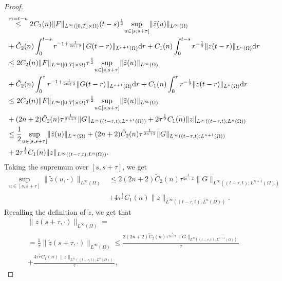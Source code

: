 \documentclass[10pt,a4paper,nouppercase,nowrite]{article}
\numberwithin{equation}{section}
\newcommand{\di}{{\rm d}}
\theoremstyle{definition}
\begin{document}
\begin{proof}
\begin{equation*}
\begin{split}
			&\overset{r:=t-u}{\le} 2 C_2(n)  \| F \|_{L^{\infty}([0,T] \times \Omega)} (t-s)^{\frac{1}{2}}  \underset{u \in [s,s+\tau]}{\sup} \| \tilde{z}(u) \|_{L^{\infty}(\Omega)}  \\ 
			&+ \tilde C_2(n) \int_0^{t-s} r^{-1+\frac{1}{2n+2}} \| G(t-r) \|_{L^{n+1}(\Omega)} \di r + C_1(n) \int_0^{t-s} r^{-\frac{1}{2}} \| z(t-r) \|_{L^{n}(\Omega)} \di r \\
			&\le 2 C_2(n) \| F \|_{L^{\infty}([0,T] \times \Omega)} \tau^{\frac{1}{2}}  \underset{u \in [s,s+\tau]}{\sup} \| \tilde{z}(u) \|_{L^{\infty}(\Omega)} \\ 
			&+\tilde C_2(n) \int_0^{\tau} r^{-1+\frac{1}{2n+2}} \| G(t-r) \|_{L^{n+1}(\Omega)} \di r + C_1(n) \int_0^{\tau} r^{-\frac{1}{2}} \| z(t-r) \|_{L^{n}(\Omega)} \di r \\
			&\le 2 C_2(n) \| F \|_{L^{\infty}([0,T] \times \Omega)} \tau^{\frac{1}{2}}  \underset{u \in [s,s+\tau]}{\sup} \| \tilde{z}(u) \|_{L^{\infty}(\Omega)} \\ 
			&+ (2n+2)\tilde C_2(n) \tau^{\frac{1}{2n+2}} \| G \|_{L^{\infty}((t-\tau,t);L^{n+1}(\Omega))} + 2 \tau^{\frac{1}{2}} C_1(n)  \| z \|_{L^{\infty}((t-\tau,t);L^n(\Omega))} \\
			&\le \frac{1}{2} \underset{u \in [s,s+\tau]}{\sup} \| \tilde{z}(u) \|_{L^{\infty}(\Omega)} + (2n+2) \tilde C_2(n) \tau^{\frac{1}{2n+2}} \| G \|_{L^{\infty}((t-\tau,t);L^{n+1}(\Omega))} \\
			&+2 \tau^{\frac{1}{2}} C_1(n) \| z \|_{L^{\infty}((t-\tau,t);L^n(\Omega))}.
			\end{split}
		\end{equation*}
		Taking the supremum over $[s,s+\tau]$, we get
		\begin{equation*}
			\begin{split}
				\underset{u \in [s,s+\tau]}{\sup} \| \tilde{z}(u,\cdot) \|_{L^{\infty}(\Omega)} &\le 2(2n+2)\tilde C_2(n)  \tau^{\frac{1}{2n+2}} \| G \|_{L^{\infty}((t-\tau,t);L^{n+1}(\Omega))} \\
				&+4 \tau^{\frac{1}{2}} C_1(n) \| z \|_{L^{\infty}((t-\tau,t);L^n(\Omega))}.
			\end{split}
		\end{equation*}
		Recalling the definition of $\tilde{z}$, we get that
		\begin{multline*}
			\| z(s+\tau,\cdot) \|_{L^{\infty}(\Omega)} = \\ = \frac{1}{\tau} \| \tilde{z}(s+\tau,\cdot) \|_{L^{\infty}(\Omega)} \le \frac{2(2n+2) \tilde C_2(n) \tau^{\frac{1}{2n+2}} \| G \|_{L^{\infty}((t-\tau,t);L^{n+1}(\Omega))}}{\tau} \\ + \frac{4 \tau^{\frac{1}{2}} C_1(n)  \| z \|_{L^{\infty}((t-\tau,t);L^n(\Omega))}}{\tau},

\end{multline*}
\end{proof}
\end{document}
